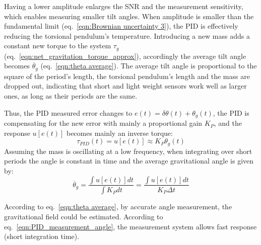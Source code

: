 \documentclass[\main/master.tex]{subfiles}
\begin{document}
\par\noindent
Having a lower amplitude enlarges the SNR and the measurement sensitivity, which enables measuring smaller tilt angles. When amplitude is smaller than the fundamental limit (eq.~\ref{eqn:Brownian uncertainty 3}), the PID is effectively reducing the torsional pendulum's temperature. Introducing a new mass adds a constant new torque to the system $\tau_g$ (eq.~\ref{eqn:net_gravitation_torque_approx}), accordingly the average tilt angle becomes $\overline{\theta}_g$ (eq.~\ref{eqn:theta average}). The average tilt angle is proportional to the square of the period's length, the torsional pendulum's length and the mass are dropped out, indicating that short and light weight sensors work well as larger ones, as long as their periods are the same. 
\par\noindent
Thus, the PID measured error changes to $e(t) = \delta\theta(t) + \theta_g(t)$, the PID is compensating for the new error with mainly a proportional gain $K_P$, and the response $u[e(t)]$ becomes mainly an inverse torque:
\begin{equation}
\tau_{PID}(t) = u[e(t)] \approx K_P\theta_g(t) 
\label{eqn:PID_response}
\end{equation}
Assuming the mass is oscillating at a low frequency, when integrating over short periods the angle is constant in time and the average gravitational angle is given by:
\begin{equation}
\overline{\theta}_g = \frac{\int u[e(t)] dt}{\int K_P dt}= \frac{\int u[e(t)] dt}{ K_P \Delta t}
\label{eqn:PID_measurement_angle}
\end{equation}
\par\noindent
According to eq.~\ref{eqn:theta average}, by accurate angle measurement, the gravitational field could be estimated. According to eq.~\ref{eqn:PID_measurement_angle}, the measurement system allows fast response (short integration time). 
\end{document}
